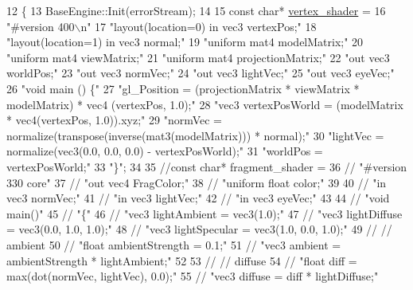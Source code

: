 \begin{DoxyCode}
12 \{
13     BaseEngine::Init(errorStream);
14 
15     \textcolor{keyword}{const} \textcolor{keywordtype}{char}* \mbox{\hyperlink{ZPGEngine_8cpp_afc33b8912f9f93d1d2544df04ad4a81a}{vertex\_shader}} =
16         \textcolor{stringliteral}{"#version 400\(\backslash\)n"}
17         \textcolor{stringliteral}{"layout(location=0) in vec3 vertexPos;"}
18         \textcolor{stringliteral}{"layout(location=1) in vec3 normal;"}
19         \textcolor{stringliteral}{"uniform mat4 modelMatrix;"}
20         \textcolor{stringliteral}{"uniform mat4 viewMatrix;"}
21         \textcolor{stringliteral}{"uniform mat4 projectionMatrix;"}
22         \textcolor{stringliteral}{"out vec3 worldPos;"}
23         \textcolor{stringliteral}{"out vec3 normVec;"}
24         \textcolor{stringliteral}{"out vec3 lightVec;"}
25         \textcolor{stringliteral}{"out vec3 eyeVec;"}
26         \textcolor{stringliteral}{"void main () \{"}
27             \textcolor{stringliteral}{"gl\_Position = (projectionMatrix * viewMatrix * modelMatrix) * vec4 (vertexPos, 1.0);"}
28             \textcolor{stringliteral}{"vec3 vertexPosWorld = (modelMatrix * vec4(vertexPos, 1.0)).xyz;"}
29             \textcolor{stringliteral}{"normVec = normalize(transpose(inverse(mat3(modelMatrix))) * normal);"}
30             \textcolor{stringliteral}{"lightVec = normalize(vec3(0.0, 0.0, 0.0) - vertexPosWorld);"}
31             \textcolor{stringliteral}{"worldPos = vertexPosWorld;"}
33         \textcolor{stringliteral}{"\}"};
34 
35     \textcolor{comment}{//const char* fragment\_shader =}
36     \textcolor{comment}{//  "#version 330 core"}
37     \textcolor{comment}{//  "out vec4 FragColor;"}
38     \textcolor{comment}{//  "uniform float color;"}
39 
40     \textcolor{comment}{//  "in vec3 normVec;"}
41     \textcolor{comment}{//  "in vec3 lightVec;"}
42     \textcolor{comment}{//  "in vec3 eyeVec;"}
43 
44     \textcolor{comment}{//  "void main()"}
45     \textcolor{comment}{//  "\{"}
46     \textcolor{comment}{//      "vec3 lightAmbient = vec3(1.0);"}
47     \textcolor{comment}{//      "vec3 lightDiffuse = vec3(0.0, 1.0, 1.0);"}
48     \textcolor{comment}{//      "vec3 lightSpecular = vec3(1.0, 0.0, 1.0);"}
49     \textcolor{comment}{//      // ambient}
50     \textcolor{comment}{//      "float ambientStrength = 0.1;"}
51     \textcolor{comment}{//      "vec3 ambient = ambientStrength * lightAmbient;"}
52 
53     \textcolor{comment}{//      // diffuse }
54     \textcolor{comment}{//      "float diff = max(dot(normVec, lightVec), 0.0);"}
55     \textcolor{comment}{//      "vec3 diffuse = diff * lightDiffuse;"}

\end{DoxyCode}
